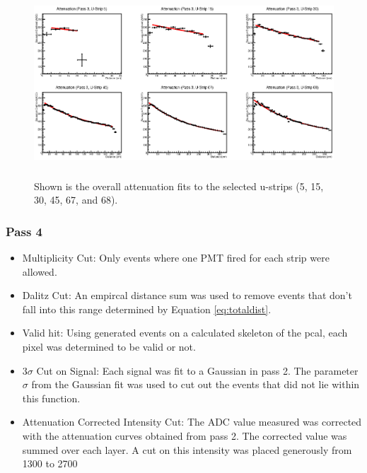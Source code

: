 \begin{figure}[h]
    \centering
    \includegraphics[height= 2.75in, keepaspectratio = true]{atpass3}
    \caption{Shown is the overall attenuation fits to the selected u-strips 
    (5, 15, 30, 45, 67, and 68).}
    \label{fig:atpass3}
\end{figure}

\clearpage
\FloatBarrier
\subsubsection{Pass 4}
\begin{itemize}
    \item Multiplicity Cut: Only events where one PMT fired for each strip were allowed.
    \item Dalitz Cut: An empircal distance sum was used to remove events that don't fall 
    into this range determined by Equation \ref{eq:totaldist}.
    \item Valid hit: Using generated events on a calculated skeleton of the pcal, each 
    pixel was determined to be valid or not.
    \item 3$\sigma$ Cut on Signal: Each signal was fit to a Gaussian in pass 2. The parameter 
    $\sigma$ from the Gaussian fit was used to cut out the events that did not lie within this function.
    \item Attenuation Corrected Intensity Cut: The ADC value measured was corrected with 
    the attenuation curves obtained from pass 2. The corrected value was summed over each 
    layer. A cut on this intensity was placed generously from 1300 to 2700
\end{itemize}


